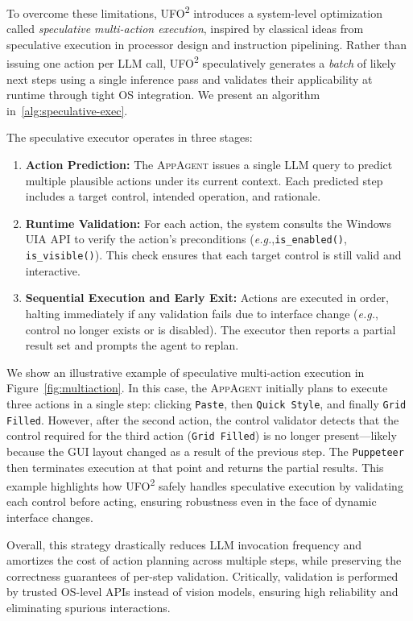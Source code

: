 \documentclass[sigplan,10pt]{acmart}
\newcommand{\name}{\textsc{UFO}\textsuperscript{2}\xspace}
\newcommand{\appa}{\textsc{AppAgent}\xspace}
\newcommand{\eg}{\textit{e.g.},\xspace}
\begin{document}
To overcome these limitations, \name introduces a system-level optimization called \emph{speculative multi-action execution}, inspired by classical ideas from speculative execution in processor design and instruction pipelining. Rather than issuing one action per LLM call, \name speculatively generates a \emph{batch} of likely next steps using a single inference pass and validates their applicability at runtime through tight OS integration. We present an algorithm in~\ref{alg:speculative-exec}.

The speculative executor operates in three stages:
\begin{enumerate}
    \item \textbf{Action Prediction:} The \appa issues a single LLM query to predict multiple plausible actions under its current context. Each predicted step includes a target control, intended operation, and rationale.
    \item \textbf{Runtime Validation:} For each action, the system consults the Windows UIA API to verify the action's preconditions (\eg \texttt{is\_enabled()}, \texttt{is\_visible()}). This check ensures that each target control is still valid and interactive.
    \item \textbf{Sequential Execution and Early Exit:} Actions are executed in order, halting immediately if any validation fails due to interface change (\eg control no longer exists or is disabled). The executor then reports a partial result set and prompts the agent to replan.
\end{enumerate}
We show an illustrative example of speculative multi-action execution in Figure~\ref{fig:multiaction}. In this case, the \appa initially plans to execute three actions in a single step: clicking \texttt{Paste}, then \texttt{Quick Style}, and finally \texttt{Grid Filled}. However, after the second action, the control validator detects that the control required for the third action (\texttt{Grid Filled}) is no longer present—likely because the GUI layout changed as a result of the previous step. The \texttt{Puppeteer} then terminates execution at that point and returns the partial results. This example highlights how \name safely handles speculative execution by validating each control before acting, ensuring robustness even in the face of dynamic interface changes. 

Overall, this strategy drastically reduces LLM invocation frequency and amortizes the cost of action planning across multiple steps, while preserving the correctness guarantees of per-step validation. Critically, validation is performed by trusted OS-level APIs instead of vision models, ensuring high reliability and eliminating spurious interactions.
\end{document}
